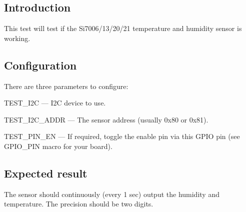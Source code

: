 \subsection*{Introduction}

This test will test if the Si7006/13/20/21 temperature and humidity sensor is working.

\subsection*{Configuration}

There are three parameters to configure\+:


\begin{DoxyItemize}
\item {\ttfamily T\+E\+S\+T\+\_\+\+I2C} --- I2C device to use.
\item {\ttfamily T\+E\+S\+T\+\_\+\+I2\+C\+\_\+\+A\+D\+DR} --- The sensor address (usually 0x80 or 0x81).
\item {\ttfamily T\+E\+S\+T\+\_\+\+P\+I\+N\+\_\+\+EN} --- If required, toggle the enable pin via this G\+P\+IO pin (see {\ttfamily G\+P\+I\+O\+\_\+\+P\+IN} macro for your board).
\end{DoxyItemize}

\subsection*{Expected result}

The sensor should continuously (every 1 sec) output the humidity and temperature. The precision should be two digits. 